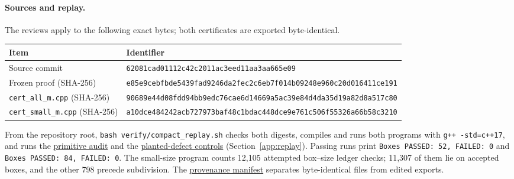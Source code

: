 \documentclass[11pt]{article}
\newcommand{\ordersrc}[2]{\href{https://github.com/uzay-eth/friend-tree-exponent/blob/62081cad01112c42c2011ac3eed11aa3aa665e09/#1}{#2}}
\newcommand{\sectag}[1]{\renewcommand{\thesection}{#1}\renewcommand{\theHsection}{#1}}
\theoremstyle{remark}
\numberwithin{equation}{section}
\begin{document}
\paragraph{Sources and replay.}
The reviews apply to the following exact bytes; both certificates are exported byte-identical.
\begin{center}\footnotesize
\begin{tabular}{@{}ll@{}}
\toprule
Item & Identifier\\
\midrule
Source commit & \texttt{62081cad01112c42c2011ac3eed11aa3aa665e09}\\
Frozen proof (SHA-256) & \texttt{e85e9cebfbde5439fad9246da2fec2c6eb7f014b09248e960c20d016411ce191}\\
\texttt{cert\_all\_m.cpp} (SHA-256) & \texttt{90689e44d08fdd94bb9edc76cae6d14669a5ac39e84d4da35d19a82d8a517c80}\\
\texttt{cert\_small\_m.cpp} (SHA-256) & \texttt{a10dce484242acb727973baf48c1bdac448dce9e761c506f55326a66b58c3210}\\
\bottomrule
\end{tabular}
\end{center}
From the repository root, \texttt{bash verify/compact\_replay.sh} checks both digests, compiles and runs both programs with \texttt{g++ -std=c++17}, and runs the \ordersrc{round3/q3-birth-order/audit_primitives.py}{primitive audit} and the \ordersrc{round3/q3-birth-order/planted_defects.py}{planted-defect controls} (Section~\ref{app:replay}). Passing runs print \texttt{Boxes PASSED: 52, FAILED: 0} and \texttt{Boxes PASSED: 84, FAILED: 0}. The small-size program counts 12{,}105 attempted box--size ledger checks; 11{,}307 of them lie on accepted boxes, and the other 798 precede subdivision. The \ordersrc{round3/PROVENANCE.md}{provenance manifest} separates byte-identical files from edited exports.

\sectag{EARLY}
\end{document}

